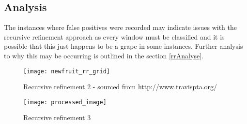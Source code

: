 \tocless\subsection{Analysis}
The instances where false positives were recorded may indicate issues with the recursive refinement approach as every window must be classified and it is possible that this just happens to be a grape in some instances.
Further analysis to why this may be occurring is outlined in the section \ref{rrAnalyse}.

\begin{figure}
\centering
    \texttt{[image: newfruit\_rr\_grid]}
      \caption{Recursive refinement 2 - sourced from http://www.travispta.org/}
      \label{fig:rr2}
\end{figure}

\begin{figure}
\centering
    \texttt{[image: processed\_image]}
      \caption{Recursive refinement 3}
      \label{fig:rr3}
\end{figure}

